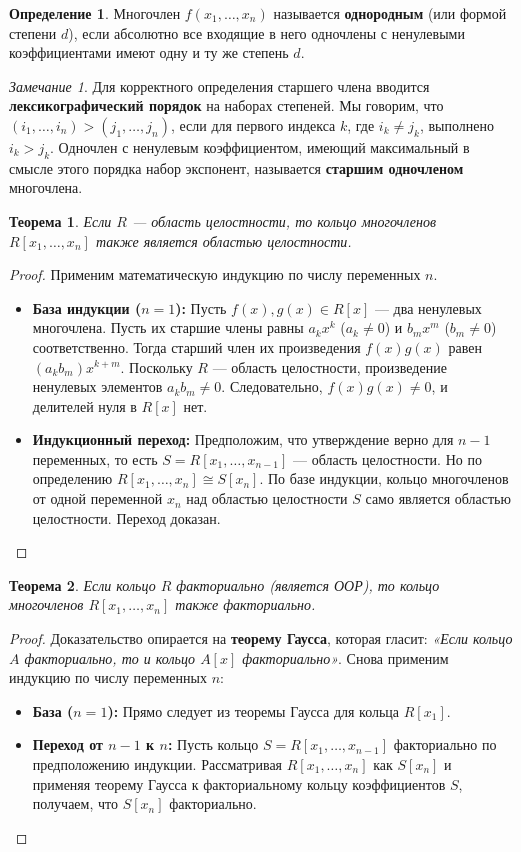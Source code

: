 \documentclass[12pt, a4paper]{article}
\newtheorem{theorem}{Теорема}
\theoremstyle{definition}
\newtheorem{definition}{Определение}
\theoremstyle{remark}
\newtheorem*{remark}{Замечание}
\begin{document}
\begin{definition}
	Многочлен $f(x_1, \dots, x_n)$ называется \textbf{однородным} (или формой степени $d$), если абсолютно все входящие в него одночлены с ненулевыми коэффициентами имеют одну и ту же степень $d$.
\end{definition}

\begin{remark}
	Для корректного определения старшего члена вводится \textbf{лексикографический порядок} на наборах степеней. Мы говорим, что $(i_1, \dots, i_n) > (j_1, \dots, j_n)$, если для первого индекса $k$, где $i_k \neq j_k$, выполнено $i_k > j_k$. Одночлен с ненулевым коэффициентом, имеющий максимальный в смысле этого порядка набор экспонент, называется \textbf{старшим одночленом} многочлена.
\end{remark}

\begin{theorem}
	Если $R$ — область целостности, то кольцо многочленов $R[x_1, \dots, x_n]$ также является областью целостности.
\end{theorem}
\begin{proof}
	Применим математическую индукцию по числу переменных $n$.
	\begin{itemize}
		\item \textbf{База индукции ($n=1$):} Пусть $f(x), g(x) \in R[x]$ — два ненулевых многочлена. Пусть их старшие члены равны $a_k x^k$ ($a_k \neq 0$) и $b_m x^m$ ($b_m \neq 0$) соответственно. Тогда старший член их произведения $f(x)g(x)$ равен $(a_k b_m) x^{k+m}$. Поскольку $R$ — область целостности, произведение ненулевых элементов $a_k b_m \neq 0$. Следовательно, $f(x)g(x) \neq 0$, и делителей нуля в $R[x]$ нет.
		\item \textbf{Индукционный переход:} Предположим, что утверждение верно для $n-1$ переменных, то есть $S = R[x_1, \dots, x_{n-1}]$ — область целостности. Но по определению $R[x_1, \dots, x_n] \cong S[x_n]$. По базе индукции, кольцо многочленов от одной переменной $x_n$ над областью целостности $S$ само является областью целостности. Переход доказан.
	\end{itemize}
\end{proof}

\begin{theorem}
	Если кольцо $R$ факториально (является ООР), то кольцо многочленов $R[x_1, \dots, x_n]$ также факториально.
\end{theorem}
\begin{proof}
	Доказательство опирается на \textbf{теорему Гаусса}, которая гласит: \textit{«Если кольцо $A$ факториально, то и кольцо $A[x]$ факториально»}.
	Снова применим индукцию по числу переменных $n$:
	\begin{itemize}
		\item \textbf{База ($n=1$):} Прямо следует из теоремы Гаусса для кольца $R[x_1]$.
		\item \textbf{Переход от $n-1$ к $n$:} Пусть кольцо $S = R[x_1, \dots, x_{n-1}]$ факториально по предположению индукции. Рассматривая $R[x_1, \dots, x_n]$ как $S[x_n]$ и применяя теорему Гаусса к факториальному кольцу коэффициентов $S$, получаем, что $S[x_n]$ факториально.
	\end{itemize}
\end{proof}
\end{document}
